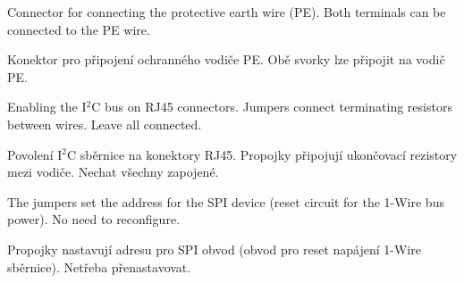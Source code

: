 \begin{English}
Connector for connecting the protective earth wire (PE). Both terminals can be connected to the PE wire.
\end{English}

\begin{Czech}
Konektor pro připojení ochranného vodiče PE. Obě svorky lze připojit na vodič PE.
\end{Czech}


\begin{English}
\end{English}

\begin{Czech}
\end{Czech}


\begin{English}
Enabling the I$^2$C bus on RJ45 connectors. Jumpers connect terminating resistors between wires. Leave all connected.
\end{English}

\begin{Czech}
Povolení I$^2$C sběrnice na konektory RJ45. Propojky připojují ukončovací rezistory mezi vodiče. Nechat všechny zapojené.
\end{Czech}


\begin{English}
\end{English}

\begin{Czech}
\end{Czech}


\begin{English}
The jumpers set the address for the SPI device (reset circuit for the 1-Wire bus power). No need to reconfigure.
\end{English}

\begin{Czech}
Propojky nastavují adresu pro SPI obvod (obvod pro reset napájení 1-Wire sběrnice).  Netřeba přenastavovat.
\end{Czech}



